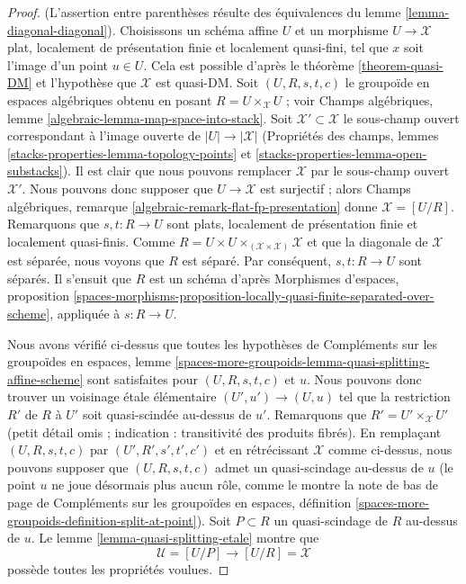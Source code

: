 \begin{proof}
(L'assertion entre parenth\`eses r\'esulte des \'equivalences du
lemme \ref{lemma-diagonal-diagonal}).
Choisissons un sch\'ema affine $U$ et un morphisme $U \to \mathcal{X}$
plat, localement de pr\'esentation finie et localement quasi-fini, tel que $x$
soit l'image d'un point $u \in U$. Cela est possible d'apr\`es
le th\'eor\`eme \ref{theorem-quasi-DM} et l'hypoth\`ese que $\mathcal{X}$
est quasi-DM. Soit $(U, R, s, t, c)$ le groupo\"ide en espaces alg\'ebriques
obtenu en posant $R = U \times_\mathcal{X} U$ ; voir
Champs alg\'ebriques, lemme \ref{algebraic-lemma-map-space-into-stack}.
Soit $\mathcal{X}' \subset \mathcal{X}$ le sous-champ ouvert correspondant
\`a l'image ouverte de $|U| \to |\mathcal{X}|$
(Propri\'et\'es des champs, lemmes
\ref{stacks-properties-lemma-topology-points} et
\ref{stacks-properties-lemma-open-substacks}).
Il est clair que nous pouvons remplacer $\mathcal{X}$ par le sous-champ ouvert $\mathcal{X}'$.
Nous pouvons donc supposer que $U \to \mathcal{X}$ est surjectif ; alors
Champs alg\'ebriques, remarque \ref{algebraic-remark-flat-fp-presentation}
donne $\mathcal{X} = [U/R]$.
Remarquons que $s, t : R \to U$ sont plats, localement de pr\'esentation finie
et localement quasi-finis.
Comme $R = U \times U \times_{(\mathcal{X} \times \mathcal{X})} \mathcal{X}$
et que la diagonale de $\mathcal{X}$ est s\'epar\'ee, nous voyons que
$R$ est s\'epar\'e. Par cons\'equent, $s, t : R \to U$ sont s\'epar\'es. Il s'ensuit
que $R$ est un sch\'ema d'apr\`es
Morphismes d'espaces, proposition
\ref{spaces-morphisms-proposition-locally-quasi-finite-separated-over-scheme},
appliqu\'ee \`a $s : R \to U$.

\medskip\noindent
Nous avons v\'erifi\'e ci-dessus que toutes les hypoth\`eses de
Compl\'ements sur les groupo\"ides en espaces, lemme
\ref{spaces-more-groupoids-lemma-quasi-splitting-affine-scheme}
sont satisfaites pour $(U, R, s, t, c)$ et $u$.
Nous pouvons donc trouver un voisinage \'etale \'el\'ementaire
$(U', u') \to (U, u)$ tel que la restriction $R'$ de $R$ \`a $U'$
soit quasi-scind\'ee au-dessus de $u'$. Remarquons que $R' = U' \times_\mathcal{X} U'$
(petit d\'etail omis ; indication : transitivit\'e des produits fibr\'es).
En rempla\c{c}ant $(U, R, s, t, c)$ par $(U', R', s', t', c')$ et en r\'etr\'ecissant
$\mathcal{X}$ comme ci-dessus, nous pouvons supposer que $(U, R, s, t, c)$ admet
un quasi-scindage au-dessus de $u$ (le point $u$ ne joue d\'esormais plus
aucun r\^ole, comme le montre la note de bas de page de
Compl\'ements sur les groupo\"ides en espaces, d\'efinition
\ref{spaces-more-groupoids-definition-split-at-point}).
Soit $P \subset R$ un quasi-scindage de $R$ au-dessus de $u$.
Le lemme \ref{lemma-quasi-splitting-etale}
montre que
$$
\mathcal{U} = [U/P] \longrightarrow [U/R] = \mathcal{X}
$$
poss\`ede toutes les propri\'et\'es voulues.
\end{proof}

